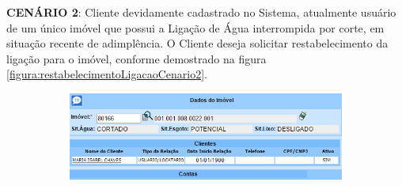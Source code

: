 \begin{flushleft}
	\begin{description}
		\item \textbf{CENÁRIO 2}: Cliente devidamente cadastrado no Sistema, atualmente usuário de um único imóvel que possui a Ligação de Água interrompida por corte, em situação recente de adimplência. O Cliente deseja solicitar restabelecimento da ligação para o imóvel, conforme demostrado na figura \ref{figura:restabelecimentoLigacaoCenario2}.
		\begin{figure}[H]
			\centering
			\caption{\textbf{Restabelecimento da Ligação de Água - Cenário de Teste 2}}
			\label{figura:restabelecimentoLigacaoCenario2}
			\begin{subfigure}[H]{\textwidth}
				\centering
				\includegraphics{figuras/cenarios/restabelecimento/cenario_2.PNG}
			\end{subfigure}
		\end{figure}
	\end{description}
	

\end{flushleft}
